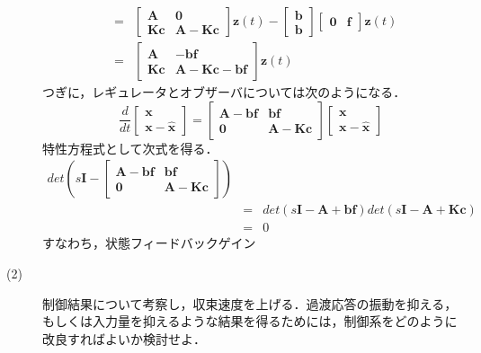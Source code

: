 \documentclass[12pt]{jsarticle}
\begin{document}
\begin{description}
\begin{eqnarray}
&=& \left[\begin{array}{cc}{\bm A}&{\bm 0}\\{\bm K}{\bm c}&{\bm A}-{\bm K}{\bm c}\end{array}\right] {\bm z}(t) - \left[\begin{array}{c}{\bm b}\\{\bm b}\end{array}\right] \left[\begin{array}{cc}{\bm 0}&{\bm f}\end{array}\right]{\bm z}(t) \nonumber \\
&=& \left[\begin{array}{cc}{\bm A}&-{\bm b}{\bm f}\\{\bm K}{\bm c}&{\bm A}-{\bm K}{\bm c}-{\bm b}{\bm f}\end{array}\right] {\bm z}(t)
\end{eqnarray}
  つぎに，レギュレータとオブザーバについては次のようになる．
\begin{equation}
  \frac{d}{dt} \left[\begin{array}{c}{\bm x}\\{\bm x}-\hat{\bm x}\end{array}\right] = \left[\begin{array}{cc}{\bm A}-{\bm b}{\bm f}&{\bm b}{\bm f}\\{\bm 0}&{\bm A}-{\bm K}{\bm c}\end{array}\right] \left[\begin{array}{c}{\bm x}\\{\bm x}-\hat{\bm x}\end{array}\right]
\end{equation}
特性方程式として次式を得る．
\begin{eqnarray}
  det( s{\bm I} - \left[\begin{array}{cc}{\bm A}-{\bm b}{\bm f}&{\bm b}{\bm f}\\{\bm 0}&{\bm A}-{\bm K}{\bm c}\end{array}\right] )\nonumber \\ &=& det(s{\bm I} - {\bm A} + {\bm b}{\bm f})det(s{\bm I} - {\bm A} + {\bm K}{\bm c}) \nonumber \\
  &=& 0
\end{eqnarray}
すなわち，状態フィードバックゲイン
\begin{equation}
\end{equation}
  \item[(2)] 制御結果について考察し，収束速度を上げる．過渡応答の振動を抑える，もしくは入力量を抑えるような結果を得るためには，制御系をどのように改良すればよいか検討せよ．
\end{description}
\end{document}

